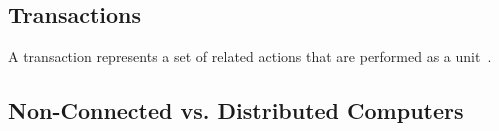 \documentclass[a4paper,12pt]{article}
\begin{document}

\subsection*{Transactions}
A transaction represents a set of related actions that are performed as a unit~\citep{nested-transactions}.

\subsection*{Non-Connected vs. Distributed Computers}





\vskip 0.2in
\newpage


\end{document}
